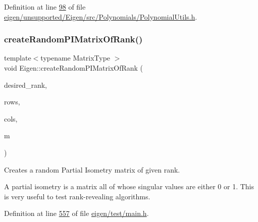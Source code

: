 Definition at line \hyperlink{eigen_2unsupported_2_eigen_2src_2_polynomials_2_polynomial_utils_8h_source_l00098}{98} of file \hyperlink{eigen_2unsupported_2_eigen_2src_2_polynomials_2_polynomial_utils_8h_source}{eigen/unsupported/\+Eigen/src/\+Polynomials/\+Polynomial\+Utils.\+h}.

\mbox{\label{namespace_eigen_a0d9a7ddcee5c7c8defaba3628455efb2}} 
\subsubsection{\texorpdfstring{create\+Random\+P\+I\+Matrix\+Of\+Rank()}{createRandomPIMatrixOfRank()}}
{\footnotesize\ttfamily template$<$typename Matrix\+Type $>$ \\
void Eigen\+::create\+Random\+P\+I\+Matrix\+Of\+Rank (\begin{DoxyParamCaption}\item[{\hyperlink{namespace_eigen_a62e77e0933482dafde8fe197d9a2cfde}{Index}}]{desired\+\_\+rank,  }\item[{\hyperlink{namespace_eigen_a62e77e0933482dafde8fe197d9a2cfde}{Index}}]{rows,  }\item[{\hyperlink{namespace_eigen_a62e77e0933482dafde8fe197d9a2cfde}{Index}}]{cols,  }\item[{Matrix\+Type \&}]{m }\end{DoxyParamCaption})}

Creates a random Partial Isometry matrix of given rank.

A partial isometry is a matrix all of whose singular values are either 0 or 1. This is very useful to test rank-\/revealing algorithms. 

Definition at line \hyperlink{eigen_2test_2main_8h_source_l00557}{557} of file \hyperlink{eigen_2test_2main_8h_source}{eigen/test/main.\+h}.

\mbox{\label{namespace_eigen_af5aa651137636b1cdbd27de1cfe91148}} 
